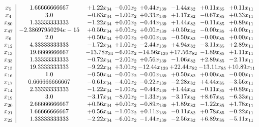 \documentclass[8pt]{article}
\begin{document}
\[\begin{array}{c| c c@{\hskip 2pt} c@{\hskip 2pt} c@{\hskip 2pt} c@{\hskip 2pt} c@{\hskip 2pt} c@{\hskip 2pt} }
 x_{5}   &  1.66666666667 & +  1.22 x_{34} & -0.00 x_{2} & +  0.44 x_{139} & -1.44 x_{82} & +  0.11 x_{85} & +  0.11 x_{11}\\
 x_{4}   &  3.0 & -0.83 x_{34} & -1.00 x_{2} & +  0.33 x_{139} & +  1.17 x_{82} & -0.67 x_{85} & +  0.33 x_{11}\\
 x_{80}   &  1.33333333333 & -1.22 x_{34} & +  0.00 x_{2} & -0.44 x_{139} & +  1.44 x_{82} & -0.11 x_{85} & +  0.89 x_{11}\\
 x_{47}   &  -2.38697950294e-15 & +  0.50 x_{34} & +  0.00 x_{2} & +  0.00 x_{139} & +  0.50 x_{82} & -0.00 x_{85} & +  0.00 x_{11}\\
 x_{6}   &  2.0 & +  0.50 x_{34} & +  0.00 x_{2} & +  0.00 x_{139} & -0.50 x_{82} & -0.00 x_{85} & +  0.00 x_{11}\\
 x_{12}   &  4.33333333333 & -1.72 x_{34} & +  1.00 x_{2} & -2.44 x_{139} & +  4.94 x_{82} & -3.11 x_{85} & +  2.89 x_{11}\\
 x_{13}   &  19.6666666667 & -13.78 x_{34} & -6.00 x_{2} & -14.56 x_{139} & + 17.56 x_{82} & -1.89 x_{85} & +  1.11 x_{11}\\
 x_{33}   &  1.33333333333 & -0.72 x_{34} & -2.00 x_{2} & +  0.56 x_{139} & -1.06 x_{82} & +  2.89 x_{85} & -2.11 x_{11}\\
 x_{15}   &  19.3333333333 & -9.22 x_{34} & +  3.00 x_{2} & -12.44 x_{139} & + 22.44 x_{82} & -13.11 x_{85} & + 10.89 x_{11}\\
 x_{16}   &  1.0 & -0.50 x_{34} & -0.00 x_{2} & -0.00 x_{139} & +  0.50 x_{82} & +  0.00 x_{85} & -0.00 x_{11}\\
 x_{17}   &  0.666666666667 & -0.61 x_{34} & -4.00 x_{2} & -0.22 x_{139} & -2.28 x_{82} & +  4.44 x_{85} & -3.56 x_{11}\\
 x_{14}   &  2.33333333333 & -1.22 x_{34} & -1.00 x_{2} & -0.44 x_{139} & +  1.44 x_{82} & -0.11 x_{85} & +  0.89 x_{11}\\
 x_{19}   &  3.0 & -3.17 x_{34} & -8.00 x_{2} & -1.33 x_{139} & -3.17 x_{82} & +  8.67 x_{85} & -6.33 x_{11}\\
 x_{20}   &  2.66666666667 & +  0.56 x_{34} & +  0.00 x_{2} & -0.89 x_{139} & +  1.89 x_{82} & -1.22 x_{85} & +  1.78 x_{11}\\
 x_{21}   &  1.66666666667 & +  0.56 x_{34} & -1.00 x_{2} & +  0.11 x_{139} & -0.11 x_{82} & +  0.78 x_{85} & -0.22 x_{11}\\
 x_{22}   &  1.33333333333 & -2.22 x_{34} & -6.00 x_{2} & -1.44 x_{139} & -2.56 x_{82} & +  6.89 x_{85} & -5.11 x_{11}\\

\end{array}\]
\end{document}
